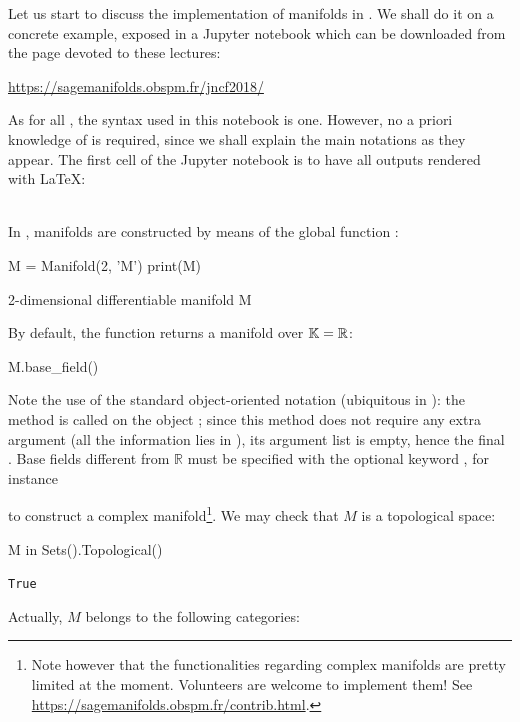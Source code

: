 Let us start to discuss the implementation of manifolds in \Sage{}. We shall
do it on a concrete example, exposed in a Jupyter notebook which can be downloaded
from the page devoted to these lectures:
\begin{center}
\url{https://sagemanifolds.obspm.fr/jncf2018/}
\end{center}
As for all \Sage{}, the syntax used in this notebook is  one. However, no
a priori knowledge of  is required, since we shall explain the
main notations as they appear. The first cell of the Jupyter notebook is to have
all outputs rendered with \LaTeX:
\begin{NBin}
\end{NBin}
\ \\
In \Sage{}, manifolds are constructed by means of the global function :
\begin{NBin}
M = Manifold(2, 'M')
print(M)
\end{NBin}
\begin{NBprint}
2-dimensional differentiable manifold M
\end{NBprint}
By default, the function  returns a manifold over $\mathbb{K}=\mathbb{R}$:
\begin{NBin}
M.base_field()
\end{NBin}
\begin{NBoutM}
\end{NBoutM}
Note the use of the standard object-oriented notation (ubiquitous in
): the method  is called on the object ;
since this method does not require any extra argument (all the information lies
in ), its argument list is empty, hence the final \code{()}.
Base fields different from $\mathbb{R}$
must be specified with the optional keyword , for instance
\begin{flushleft}
\end{flushleft}
to construct a complex manifold\footnote{Note however that the functionalities
regarding complex manifolds are pretty limited at the moment. Volunteers are
welcome to implement them! See \url{https://sagemanifolds.obspm.fr/contrib.html}.}.
We may check that $M$ is a topological space:
\begin{NBin}
M in Sets().Topological()
\end{NBin}
\begin{NBout}
\texttt{True}
\end{NBout}
Actually, $M$ belongs to the following categories:

